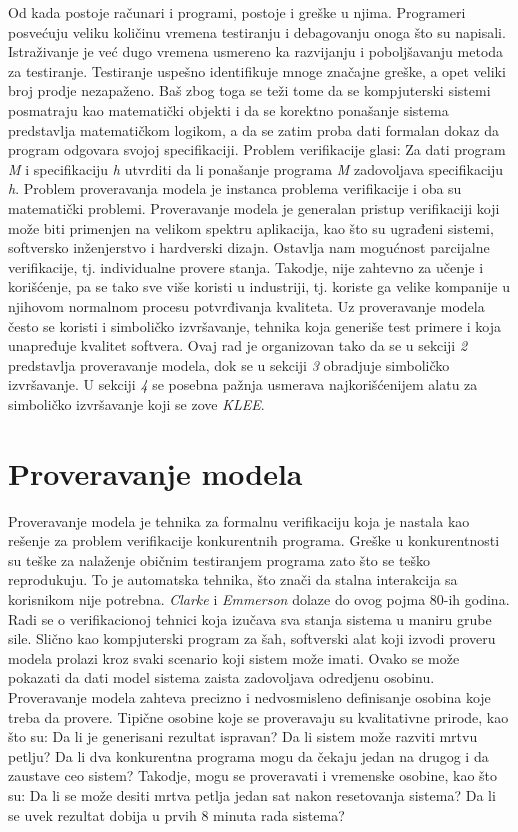\documentclass[a4paper]{article}
\begin{document}
Od kada postoje računari i programi, postoje i greške u njima. Programeri posvećuju veliku količinu vremena testiranju i debagovanju onoga što su napisali. Istraživanje je već dugo vremena usmereno ka razvijanju i poboljšavanju metoda za testiranje. Testiranje uspešno identifikuje mnoge značajne greške, a opet veliki broj prodje nezapaženo. Baš zbog toga se teži tome da se kompjuterski sistemi posmatraju kao matematički objekti i da se korektno ponašanje sistema predstavlja matematičkom logikom, a da se zatim proba dati formalan dokaz da program odgovara svojoj specifikaciji. Problem verifikacije glasi: Za dati program \textit{M} i specifikaciju \textit{h} utvrditi da li ponašanje programa \textit{M} zadovoljava specifikaciju \textit{h}. Problem proveravanja modela je instanca problema verifikacije i oba su matematički problemi. Proveravanje modela je generalan pristup verifikaciji koji može biti primenjen na velikom spektru aplikacija, kao što su ugrađeni sistemi, softversko inženjerstvo i hardverski dizajn. Ostavlja nam mogućnost parcijalne verifikacije, tj. individualne provere stanja. Takodje, nije zahtevno za učenje i korišćenje, pa se tako sve više koristi u industriji, tj. koriste ga velike kompanije u njihovom normalnom procesu potvrđivanja kvaliteta. Uz proveravanje modela često se koristi i simboličko izvršavanje, tehnika koja generiše test primere i koja unapređuje kvalitet softvera. Ovaj rad je organizovan tako da se u sekciji \textit{2} predstavlja proveravanje modela, dok se u sekciji \textit{3} obradjuje simboličko izvršavanje. U sekciji \textit{4} se posebna pažnja usmerava najkorišćenijem alatu za simboličko izvršavanje koji se zove \textit{KLEE}.


\section{Proveravanje modela}
\label{sec:naslov1}

Proveravanje modela je tehnika za formalnu verifikaciju koja je nastala kao rešenje za problem verifikacije konkurentnih programa. Greške u konkurentnosti su teške za nalaženje običnim testiranjem programa zato što se teško reprodukuju. To je automatska tehnika, što znači da stalna interakcija sa korisnikom nije potrebna. \textit{Clarke} i \textit{Emmerson} dolaze do ovog pojma 80-ih godina. Radi se o verifikacionoj tehnici koja izučava sva stanja sistema u maniru grube sile. Slično kao kompjuterski program za šah, softverski alat koji izvodi proveru modela prolazi kroz svaki scenario koji sistem može imati. Ovako se može pokazati da dati model sistema zaista zadovoljava odredjenu osobinu. Proveravanje modela zahteva precizno i nedvosmisleno definisanje osobina koje treba da provere. Tipične osobine koje se proveravaju su kvalitativne prirode, kao što su: Da li je generisani rezultat ispravan? Da li sistem može razviti mrtvu petlju? Da li dva konkurentna programa mogu da čekaju jedan na drugog i da zaustave ceo sistem? Takodje, mogu se proveravati i vremenske osobine, kao što su: Da li se može desiti mrtva petlja jedan sat nakon resetovanja sistema? Da li se uvek rezultat dobija u prvih 8 minuta rada sistema?\cite{principles}
\end{document}
